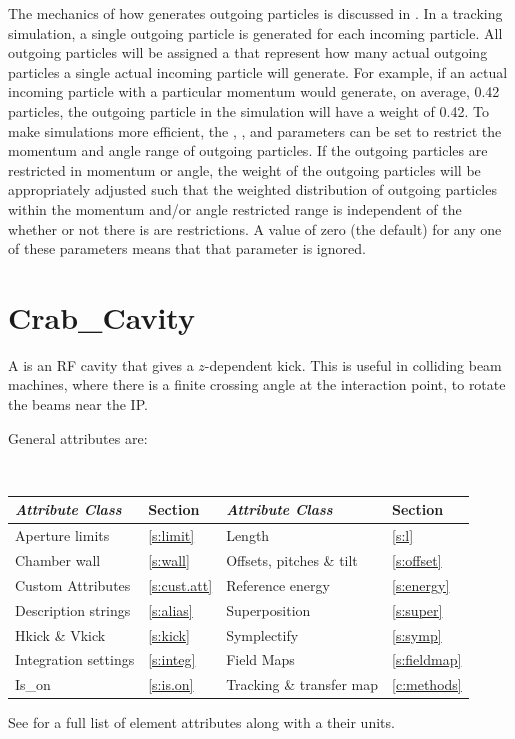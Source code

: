 The mechanics of how \bmad generates outgoing particles is discussed in .
In a tracking simulation, a single outgoing particle is generated for each incoming particle.  All
outgoing particles will be assigned a  that represent how many actual outgoing particles
a single actual incoming particle will generate. For example, if an actual incoming particle with a
particular momentum would generate, on average, 0.42 particles, the outgoing particle in the
simulation will have a weight of 0.42.  To make simulations more efficient, the ,
, and  parameters can be set to restrict the momentum and angle
range of outgoing particles. If the outgoing particles are restricted in momentum or angle, the
weight of the outgoing particles will be appropriately adjusted such that the weighted distribution
of outgoing particles within the momentum and/or angle restricted range is independent of the
whether or not there is are restrictions.  A value of zero (the default) for any one of these
parameters means that that parameter is ignored.

\section{Crab_Cavity}
\label{s:crab}

A  is an RF cavity that gives a $z$-dependent kick. This is useful in colliding beam
machines, where there is a finite crossing angle at the interaction point, to rotate the beams near the IP.

General  attributes are:
\begin{center}
\tt
\begin{tabular}{llll} \toprule
  {\sl Attribute Class}      & Section           & {\sl Attribute Class}      & Section            \\ \midrule
  Aperture limits            & \ref{s:limit}     & Length                     & \ref{s:l}          \\
  Chamber wall               & \ref{s:wall}      & Offsets, pitches \& tilt   & \ref{s:offset}     \\
  Custom Attributes          & \ref{s:cust.att}  & Reference energy           & \ref{s:energy}     \\ 
  Description strings        & \ref{s:alias}     & Superposition              & \ref{s:super}      \\
  Hkick \& Vkick             & \ref{s:kick}      & Symplectify                & \ref{s:symp}       \\
  Integration settings       & \ref{s:integ}     & Field Maps                 & \ref{s:fieldmap}   \\
  Is_on                      & \ref{s:is.on}     & Tracking \& transfer map   & \ref{c:methods}    \\
  \bottomrule
\end{tabular}
\end{center}
\toffset
See  for a full list of element attributes along with a their units.

